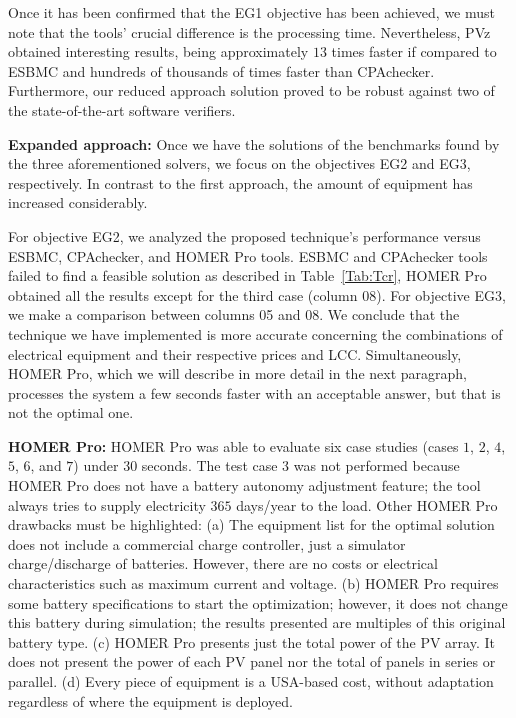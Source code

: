 \documentclass[review]{elsarticle}
\begin{document}
Once it has been confirmed that the EG1 objective has been achieved, we must note that the tools' crucial difference is the processing time. Nevertheless, PVz obtained interesting results, being approximately $13$ times faster if compared to ESBMC and hundreds of thousands of times faster than CPAchecker. Furthermore, our reduced approach solution proved to be robust against two of the state-of-the-art software verifiers.

\textbf{Expanded approach:} Once we have the solutions of the benchmarks found by the three aforementioned solvers, we focus on the objectives EG2 and EG3, respectively. In contrast to the first approach, the amount of equipment has increased considerably.

For objective EG2, we analyzed the proposed technique's performance versus ESBMC, CPAchecker, and HOMER Pro tools. ESBMC and CPAchecker tools failed to find a feasible solution as described in Table~\ref{Tab:Tcr}, HOMER Pro obtained all the results except for the third case (column 08). For objective EG3, we make a comparison between columns 05 and 08. We conclude that the technique we have implemented is more accurate concerning the combinations of electrical equipment and their respective prices and LCC. Simultaneously, HOMER Pro, which we will describe in more detail in the next paragraph, processes the system a few seconds faster with an acceptable answer, but that is not the optimal one.

\textbf{HOMER Pro:} HOMER Pro was able to evaluate six case studies (cases $1$, $2$, $4$, $5$, $6$, and $7$) under $30$ seconds. The test case $3$ was not performed because HOMER Pro does not have a battery autonomy adjustment feature; the tool always tries to supply electricity $365$ days/year to the load. Other HOMER Pro drawbacks must be highlighted: (a) The equipment list for the optimal solution does not include a commercial charge controller, just a simulator charge/discharge of batteries. However, there are no costs or electrical characteristics such as maximum current and voltage. (b) HOMER Pro requires some battery specifications to start the optimization; however, it does not change this battery during simulation; the results presented are multiples of this original battery type. (c) HOMER Pro presents just the total power of the PV array. It does not present the power of each PV panel nor the total of panels in series or parallel. (d) Every piece of equipment is a USA-based cost, without adaptation regardless of where the equipment is deployed.
\end{document}
